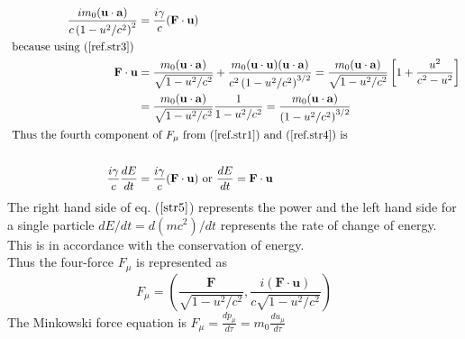 \begin{enumerate}
\begin{align}
	\frac{i m_{0}(\mathbf{u} \cdot \mathbf{a})}{c\left(1-u^{2} / c^{2}\right)^{2}}&=\frac{i \gamma}{c}(\mathbf{F} \cdot \mathbf{u})\label{ref.str4} \\
	\text { because using ($\ref{ref.str3}$) } \notag \\
	\mathbf{F} \cdot \mathbf{u}&=\frac{m_{0}(\mathbf{u} \cdot \mathbf{a})}{\sqrt{1-u^{2} / c^{2}}}+\frac{m_{0}(\mathbf{u} \cdot \mathbf{u})(\mathbf{u} \cdot \mathbf{a})}{c^{2}\left(1-u^{2} / c^{2}\right)^{3 / 2}}=\frac{m_{0}(\mathbf{u} \cdot \mathbf{a})}{\sqrt{1-u^{2} / c^{2}}}\left[1+\frac{u^{2}}{c^{2}-u^{2}}\right] \label{str4}\\
	&=\frac{m_{0}(\mathbf{u} \cdot \mathbf{a})}{\sqrt{1-u^{2} / c^{2}}} \frac{1}{1-u^{2} / c^{2}}=\frac{m_{0}(\mathbf{u} \cdot \mathbf{a})}{\left(1-u^{2} / c^{2}\right)^{3 / 2}} \notag\\
	\intertext { Thus the fourth component of $F_{\mu}$ from ($\ref{ref.str1}$)  and ($\ref{ref.str4}$) is }\\
	\frac{i \gamma}{c} \frac{d E}{d t}&=\frac{i \gamma}{c}(\mathbf{F} \cdot \mathbf{u}) \text { or } \frac{d E}{d t}=\mathbf{F} \cdot \mathbf{u} \label{str5}		
	\end{align}
	The right hand side of eq. ($\ref{str5}$) represents the power and the left hand side for a single particle $d E / d t=d\left(m c^{2}\right) / d t$ represents the rate of change of energy. This is in accordance with the conservation of energy.\\
	Thus the four-force
	$F_{\mu}$ is represented as\\
	\begin{equation}
	F_{\mu}=\left(\frac{\mathbf{F}}{\sqrt{1-u^{2} / c^{2}}}, \frac{i(\mathbf{F} \cdot \mathbf{u})}{c \sqrt{1-u^{2} / c^{2}}}\right)
	\end{equation}
	The Minkowski force equation is
	$F_{\mu}=\frac{d p_{\mu}}{d \tau}=m_{0} \frac{d u_{\mu}}{d \tau}$
\end{enumerate}
